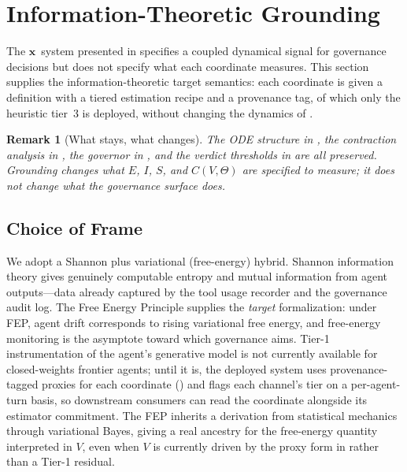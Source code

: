 \documentclass[11pt,twocolumn]{article}
\newtheorem{remark}[theorem]{Remark}
\newcommand{\eisv}{\ensuremath{\mathbf{x}}}
\newcommand{\cv}{\ensuremath{C(V,\Theta)}}
\begin{document}
\section{Information-Theoretic Grounding}
\label{sec:grounding}

The \eisv\ system presented in  specifies a
coupled dynamical signal for governance decisions but does not
specify what each coordinate measures. This section supplies the
information-theoretic target semantics: each coordinate is given
a definition with a tiered estimation recipe and a provenance tag,
of which only the heuristic tier~3 is deployed, without changing the dynamics of
.

\begin{remark}[What stays, what changes]
The ODE structure in , the contraction
analysis in , the governor in
, and the verdict thresholds in  are
all preserved. Grounding changes what $E$, $I$, $S$, and
$\cv$ are \emph{specified to measure}; it does not change what the governance surface
\emph{does}.
\end{remark}

\subsection{Choice of Frame}

We adopt a Shannon plus variational (free-energy) hybrid. Shannon
information theory gives genuinely computable entropy and mutual
information from agent outputs---data already captured by the tool
usage recorder and the governance audit log. The Free Energy Principle
\cite{friston2010free} supplies the \emph{target} formalization: under
FEP, agent drift corresponds to rising variational free energy, and
free-energy monitoring is the asymptote toward which governance aims.
Tier-1 instrumentation of the agent's generative model is not
currently available for closed-weights frontier agents; until it is,
the deployed system uses provenance-tagged proxies for each
coordinate () and flags each channel's
tier on a per-agent-turn basis, so downstream consumers can read the
coordinate alongside its estimator commitment. The FEP inherits a
derivation from statistical mechanics through variational Bayes,
giving a real ancestry for the free-energy quantity interpreted in
$V$, even when $V$ is currently driven by the proxy form in
 rather than a Tier-1 residual.
\end{document}
